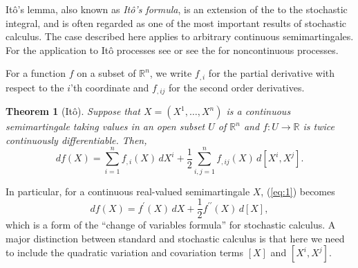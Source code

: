 \documentclass[12pt]{article}
\newtheorem*{theorem*}{Theorem}
\begin{document}

It\^o's lemma, also known as \emph{It\^o's formula}, is an extension of the  to the stochastic integral, and is often regarded as one of the most important results of stochastic calculus. The case described here applies to arbitrary continuous semimartingales. For the application to It\^o processes see  or see the  for noncontinuous processes.

For a function $f$ on a subset of $\mathbb{R}^n$, we write $f_{,i}$ for the partial derivative with respect to the $i$'th coordinate and $f_{,ij}$ for the second order derivatives.

\begin{theorem*}[It\^o]
Suppose that $X=(X^1,\ldots,X^n)$ is a continuous semimartingale taking values in an open subset $U$ of $\mathbb{R}^n$ and $f\colon U\rightarrow\mathbb{R}$ is twice continuously differentiable. Then,
\begin{equation}\label{eq:1}
df(X)=\sum_{i=1}^n f_{,i}(X)\,dX^i + \frac{1}{2}\sum_{i,j=1}^nf_{,ij}(X)\,d[X^i,X^j].
\end{equation}
\end{theorem*}

In particular, for a continuous real-valued semimartingale $X$, (\ref{eq:1}) becomes
\begin{equation*}
df(X)=f^\prime(X)\,dX + \frac{1}{2}f^{\prime\prime}(X)\,d[X],
\end{equation*}
which is a form of the ``change of variables formula'' for stochastic calculus.
A major distinction between standard and stochastic calculus is that here we need to include the quadratic variation and covariation terms $[X]$ and $[X^i,X^j]$.
\end{document}
